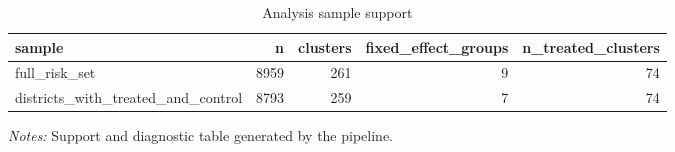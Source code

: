 \begin{table}[!htbp] \centering
\caption{Analysis sample support}
\begin{tabular}{lrrrr}
\toprule
sample & n & clusters & fixed\_effect\_groups & n\_treated\_clusters \\
\midrule
full\_risk\_set & 8959 & 261 & 9 & 74 \\
districts\_with\_treated\_and\_control & 8793 & 259 & 7 & 74 \\
\bottomrule
\end{tabular}

\begin{minipage}{0.98\textwidth}
\footnotesize \textit{Notes:} Support and diagnostic table generated by the pipeline.
\end{minipage}
\end{table}
